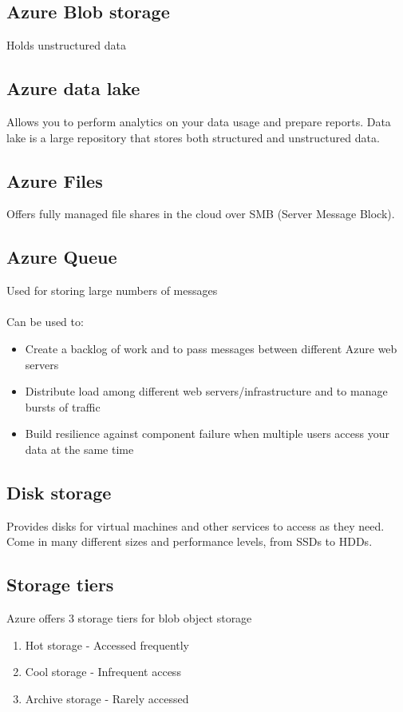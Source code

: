\documentclass{article}[18pt]
\begin{document}
\subsection{Azure Blob storage}
Holds unstructured data
\subsection{Azure data lake}
Allows you to perform analytics on your data usage and prepare reports. Data lake is a large repository that stores both structured and unstructured data.
\subsection{Azure Files}
Offers fully managed file shares in the cloud over SMB (Server Message Block). 
\subsection{Azure Queue}
Used for storing large numbers of messages\\
\\
Can be used to:
\begin{itemize}
	\item Create a backlog of work and to pass messages between different Azure web servers
	\item Distribute load among different web servers/infrastructure and to manage bursts of traffic
	\item Build resilience against component failure when multiple users access your data at the same time
\end{itemize}
\subsection{Disk storage}
Provides disks for virtual machines and other services to access as they need. Come in many different sizes and performance levels, from SSDs to HDDs.
\subsection{Storage tiers}
Azure offers 3 storage tiers for blob object storage
\begin{enumerate}
	\item Hot storage - Accessed frequently
	\item Cool storage - Infrequent access
	\item Archive storage - Rarely accessed
\end{enumerate}
\end{document}
